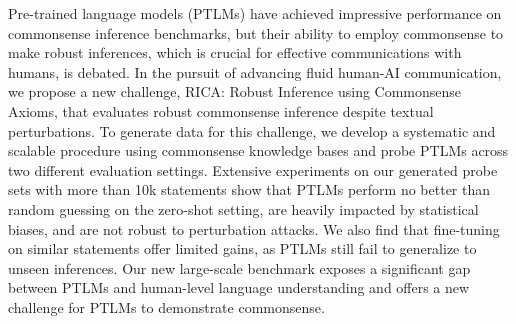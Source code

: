Pre-trained language models (PTLMs) have achieved impressive performance on commonsense inference benchmarks, but their ability to employ commonsense to make robust inferences, which is crucial for effective communications with humans, is debated. In the pursuit of advancing fluid human-AI communication, we propose a new challenge, RICA: Robust Inference using Commonsense Axioms, that evaluates robust commonsense inference despite textual perturbations. To generate data for this challenge, we develop a systematic and scalable procedure using commonsense knowledge bases and probe PTLMs across two different evaluation settings. Extensive experiments on our generated probe sets with more than 10k statements show that PTLMs perform no better than random guessing on the zero-shot setting, are heavily impacted by statistical biases, and are not robust to perturbation attacks. We also find that fine-tuning on similar statements offer limited gains, as PTLMs still fail to generalize to unseen inferences. Our new large-scale benchmark exposes a significant gap between PTLMs and human-level language understanding and offers a new challenge for PTLMs to demonstrate commonsense.
